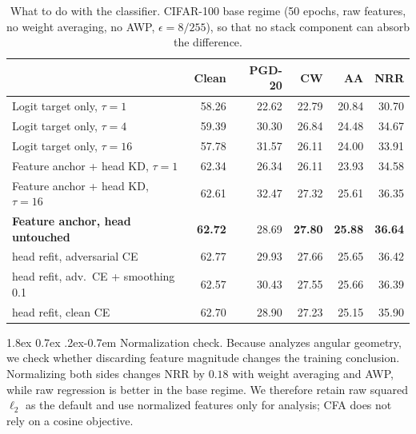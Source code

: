 \documentclass{article} %
\makeatletter
\theoremstyle{plain}
\renewcommand{\paragraph}{\@startsection{paragraph}{4}{\z@}%
  {1.8ex \@plus 0.7ex \@minus .2ex}{-0.7em}%
  {\normalfont\normalsize\bfseries}}
\makeatother
\begin{document}
\begin{table}[!htbp]
  \centering \small \setlength{\tabcolsep}{4.5pt}
  \caption{What to do with the classifier. CIFAR-100 base regime (50 epochs, raw features, no weight
  averaging, no AWP, $\epsilon=8/255$), so that no stack component can absorb the difference.}
  \label{tab:ablation}
  \begin{tabular}{lrrrrr}
    \toprule
    & Clean & PGD-20 & CW & AA & NRR \\
    \midrule
    Logit target only, $\tau=1$               & 58.26 & 22.62 & 22.79 & 20.84 & 30.70 \\
    Logit target only, $\tau=4$               & 59.39 & 30.30 & 26.84 & 24.48 & 34.67 \\
    Logit target only, $\tau=16$              & 57.78 & 31.57 & 26.11 & 24.00 & 33.91 \\
    Feature anchor + head KD, $\tau=1$        & 62.34 & 26.34 & 26.11 & 23.93 & 34.58 \\
    Feature anchor + head KD, $\tau=16$       & 62.61 & 32.47 & 27.32 & 25.61 & 36.35 \\
    \textbf{Feature anchor, head untouched}   & \textbf{62.72} & 28.69 & \textbf{27.80} & \textbf{25.88} & \textbf{36.64} \\
    \quad head refit, adversarial CE          & 62.77 & 29.93 & 27.66 & 25.65 & 36.42 \\
    \quad head refit, adv.\ CE + smoothing 0.1& 62.57 & 30.43 & 27.55 & 25.66 & 36.39 \\
    \quad head refit, clean CE                & 62.70 & 28.90 & 27.23 & 25.15 & 35.90 \\
    \bottomrule
  \end{tabular}
\end{table}

\paragraph{Normalization check.} Because  analyzes angular geometry, we
check whether discarding feature magnitude changes the training conclusion. Normalizing both sides
changes NRR by $0.18$ with weight averaging and AWP, while raw regression is better in the base
regime. We therefore retain raw squared $\ell_2$ as the default and use normalized features only for
analysis; CFA does not rely on a cosine objective.
\end{document}
